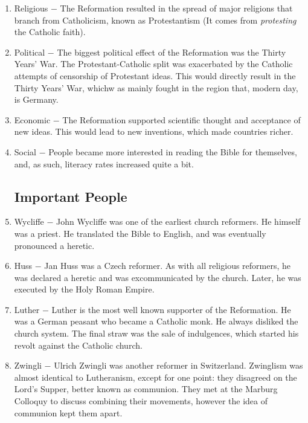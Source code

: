 \documentclass[12pt]{article}
\begin{document}
\begin{enumerate}
\item Religious $-$ The Reformation resulted in the spread of major religions that branch from Catholicism, known as Protestantism (It comes from \textit{protesting} the Catholic faith).

\item Political $-$ The biggest political effect of the Reformation was the Thirty Years' War. The Protestant-Catholic split was exacerbated by the Catholic attempts of censorship of Protestant ideas. This would directly result in the Thirty Years' War, whichw as mainly fought in the region that, modern day, is Germany.

\item Economic $-$ The Reformation supported scientific thought and acceptance of new ideas. This would lead to new inventions, which made countries richer.

\item Social $-$ People became more interested in reading the Bible for themselves, and, as such, literacy rates increased quite a bit.

\subsection{Important People}

\item Wycliffe $-$ John Wycliffe was one of the earliest church reformers. He himself was a priest. He translated the Bible to English, and was eventually pronounced a heretic.

\item Huss $-$ Jan Huss was a Czech reformer. As with all religious reformers, he was declared a heretic and was excommunicated by the church. Later, he was executed by the Holy Roman Empire.

\item Luther $-$ Luther is the most well known supporter of the Reformation. He was a German peasant who became a Catholic monk. He always disliked the church system. The final straw was the sale of indulgences, which started his revolt against the Catholic church.

\item Zwingli $-$ Ulrich Zwingli was another reformer in Switzerland. Zwinglism was almost identical to Lutheranism, except for one point: they disagreed on the Lord's Supper, better known as communion. They met at the Marburg Colloquy to discuss combining their movements, however the idea of communion kept them apart. 


\end{enumerate}
\end{document}
